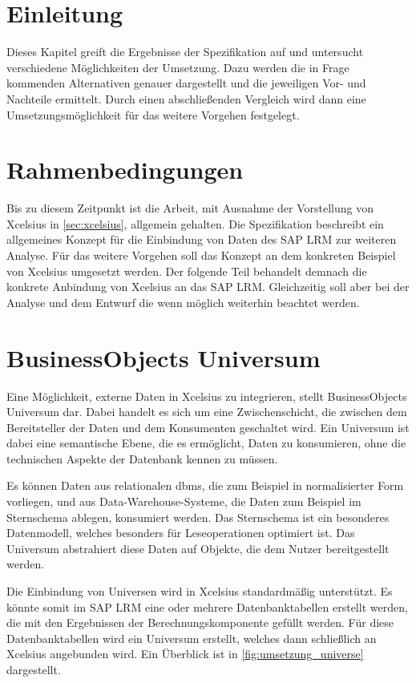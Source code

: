 \begin{onehalfspacing}
\section{Einleitung}
Dieses Kapitel greift die Ergebnisse der Spezifikation auf und untersucht verschiedene Möglichkeiten der Umsetzung. Dazu werden die in Frage kommenden Alternativen genauer dargestellt und die jeweiligen Vor- und Nachteile ermittelt. Durch einen abschließenden Vergleich wird dann eine Umsetzungsmöglichkeit für das weitere Vorgehen festgelegt.

\section{Rahmenbedingungen}
Bis zu diesem Zeitpunkt ist die Arbeit, mit Ausnahme der Vorstellung von \gls{Xcelsius} in \vref{sec:xcelsius}, allgemein gehalten. Die Spezifikation beschreibt ein allgemeines Konzept für die Einbindung von Daten des SAP LRM zur weiteren Analyse. Für das weitere Vorgehen soll das Konzept an dem konkreten Beispiel von \gls{Xcelsius} umgesetzt werden. Der folgende Teil behandelt demnach die konkrete Anbindung von \gls{Xcelsius} an das SAP LRM. Gleichzeitig soll aber bei der Analyse und dem Entwurf die  wenn möglich weiterhin beachtet werden.

\section{BusinessObjects Universum}
Eine Möglichkeit, externe Daten in \gls{Xcelsius} zu integrieren, stellt BusinessObjects Universum dar. Dabei handelt es sich um eine Zwischenschicht, die zwischen dem Bereitsteller der Daten und dem Konsumenten geschaltet wird. Ein Universum ist dabei eine semantische Ebene, die es ermöglicht, Daten zu konsumieren, ohne die technischen Aspekte der Datenbank kennen zu müssen.


Es können Daten aus relationalen \gls{dbms}, die zum Beispiel in normalisierter Form vorliegen, und aus Data-Warehouse-Systeme, die Daten zum Beispiel im Sternschema ablegen, konsumiert werden. Das Sternschema ist ein besonderes Datenmodell, welches besonders für Leseoperationen optimiert ist. Das Universum abstrahiert diese Daten auf Objekte, die dem Nutzer bereitgestellt werden.

Die Einbindung von Universen wird in \gls{Xcelsius} standardmäßig unterstützt. Es könnte somit im SAP LRM eine oder mehrere Datenbanktabellen erstellt werden, die mit den Ergebnissen der Berechnungskomponente gefüllt werden. Für diese Datenbanktabellen wird ein Universum erstellt, welches dann schließlich an \gls{Xcelsius} angebunden wird. Ein Überblick ist in \vref{fig:umsetzung_universe} dargestellt.


\end{onehalfspacing}
